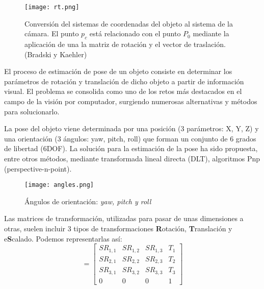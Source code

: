 \begin{figure}[h]
  \centering
  \texttt{[image: rt.png]}
  \caption{Conversión del sistemas de coordenadas del objeto al sistema de la cámara. El punto $p_c$
    está relacionado con el punto $P_0$ mediante la aplicación de una la matriz de rotación y el
    vector de traslación. (Bradski y Kaehler)}
  \label{fig:RT}
\end{figure}

El proceso de estimación de pose de un objeto consiste en determinar los parámetros de rotación y translación de dicho objeto a partir de información visual. El problema se consolida como uno de los retos más destacados en el campo de la visión por computador, surgiendo numerosas alternativas y métodos para solucionarlo.

La pose del objeto viene determinada por una posición (3 parámetros: X, Y, Z) y una orientación (3 ángulos: yaw, pitch, roll) que forman un conjunto de 6 grados de libertad (6DOF). La solución para la estimación de la pose ha sido propuesta, entre otros métodos, mediante transformada lineal directa (DLT), algoritmos Pnp (perspective-n-point).
\begin{figure}[h]
  \centering
  \texttt{[image: angles.png]}
  \caption{Ángulos de orientación: \emph{yaw, pitch y roll}}
  \label{fig:ángulos}
\end{figure}


Las matrices de transformación, utilizadas para pasar de unas dimensiones a otras, suelen incluir 3
tipos de transformaciones \textbf{R}otación, \textbf{T}ranslación y e\textbf{S}calado. Podemos representarlas así:
\begin{equation}
  [R|t] = \begin{bmatrix} SR_{1,1} & SR_{1,2} & SR_{1,3} & T_{1}  \\
    SR_{2,1} & SR_{2,2} & SR_{2,3} & T_{2}  \\
    SR_{3,1} & SR_{3,2} & SR_{3,3} & T_{3}  \\
    0    &     0   &     0   &  1
  \end{bmatrix}
\end{equation}

